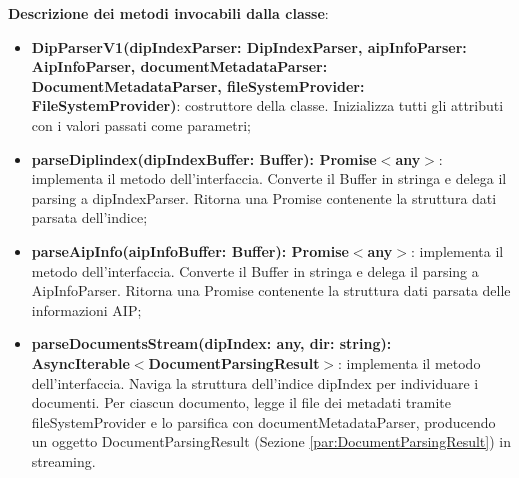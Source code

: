 \documentclass[a4paper,12pt]{article}
\begin{document}
{{{                \noindent \textbf{Descrizione dei metodi invocabili dalla classe}:
                \begin{itemize}
                    \item \textbf{DipParserV1(dipIndexParser: DipIndexParser, aipInfoParser: AipInfoParser, documentMetadataParser: DocumentMetadataParser, fileSystemProvider: FileSystemProvider)}: costruttore della classe. Inizializza tutti gli attributi con i valori passati come parametri;
                    \item \textbf{parseDiplindex(dipIndexBuffer: Buffer): Promise$<$any$>$}: implementa il metodo dell'interfaccia. Converte il Buffer in stringa e delega il parsing a dipIndexParser. Ritorna una Promise contenente la struttura dati parsata dell'indice;
                    \item \textbf{parseAipInfo(aipInfoBuffer: Buffer): Promise$<$any$>$}: implementa il metodo dell'interfaccia. Converte il Buffer in stringa e delega il parsing a AipInfoParser. Ritorna una Promise contenente la struttura dati parsata delle informazioni AIP;
                    \item \textbf{parseDocumentsStream(dipIndex: any, dir: string):\\ AsyncIterable$<$DocumentParsingResult$>$}: implementa il metodo dell'interfaccia. Naviga la struttura dell'indice dipIndex per individuare i documenti. Per ciascun documento, legge il file dei metadati tramite fileSystemProvider e lo parsifica con documentMetadataParser, producendo un oggetto DocumentParsingResult (Sezione \ref{par:DocumentParsingResult}) in streaming.
                \end{itemize}
}}}
\end{document}
